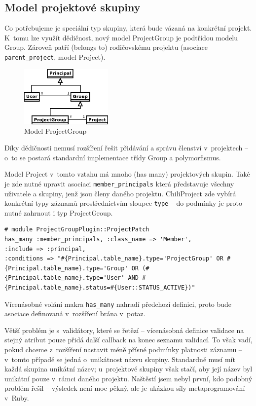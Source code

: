 \documentclass[thesis=B,czech]{FITthesis}[2012/05/02]
\begin{document}
\subsection{Model projektové skupiny}

Co potřebujeme je speciální typ skupiny, která bude vázaná na konkrétní
projekt. K~tomu lze využít dědičnost, nový model ProjectGroup je
podtřídou modelu Group. Zároveň patří (belongs to) rodičovskému projektu
(asociace \lstinline!parent_project!, model Project).

\begin{figure}[bp]
\centering
\includegraphics[width=0.4\textwidth]{group-er3.pdf}
\caption{Model ProjectGroup}
\end{figure}

Díky dědičnosti nemusí rozšíření řešit přidávání a správu členství
v~projektech -- o~to se postará standardní implementace třídy Group a
polymorfismus.

Model Project v~tomto vztahu má mnoho (has many) projektových skupin.
Také je zde nutné upravit asociaci \lstinline!member_principals! která
představuje všechny uživatele a skupiny, jenž jsou členy daného projektu.
ChiliProject zde vybírá konkrétní typy záznamů prostřednictvím sloupce
\lstinline!type! -- do podmínky je proto nutné zahrnout i typ
ProjectGroup.

\begin{lstlisting}
# module ProjectGroupPlugin::ProjectPatch
has_many :member_principals, :class_name => 'Member',
:include => :principal,
:conditions => "#{Principal.table_name}.type='ProjectGroup' OR #{Principal.table_name}.type='Group' OR (#{Principal.table_name}.type='User' AND #{Principal.table_name}.status=#{User::STATUS_ACTIVE})"
\end{lstlisting}
Vícenásobné volání makra \lstinline!has_many! nahradí předchozí
definici, proto bude asociace definovaná v~rozšíření brána v~potaz.

Větší problém je s~validátory, které se řetězí -- vícenásobná definice
validace na stejný atribut pouze přidá další \gls{callback} na konec
seznamu validací. To však vadí, pokud chceme z~rozšíření nastavit méně
přísné podmínky platnosti záznamu -- v~tomto případě se jedná
o~unikátnost názvu skupiny. Standardně musí mít každá skupina unikátní
název; u~projektové skupiny však stačí, aby její název byl unikátní pouze v~rámci daného
projektu. Naštěstí jsem nebyl první, kdo podobný problém řešil
\citep{McAlpin2011} -- výsledek není moc pěkný, ale je ukázkou síly
metaprogramování v~Ruby.
\end{document}
